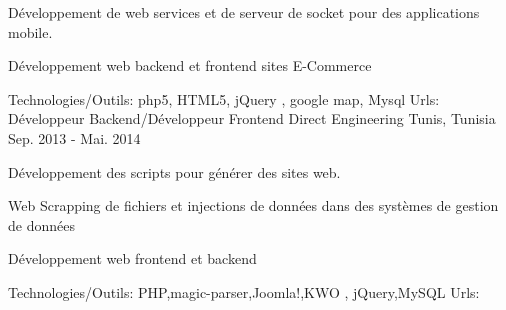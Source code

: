 \begin{cventries}
{\begin{cvitems}
        \item {Développement de web services et de serveur de socket pour des applications mobile.}
        \item {Développement web backend et frontend sites E-Commerce}
      \end{cvitems}
    }
    {\textcolor{awesome}{Technologies/Outils: } {\color{graytext}}  {php5, HTML5, jQuery , google map, Mysql}}
    {Urls:} 
    {\href{http://www.taxitasso.com/}{} \break
    \href{http://carafrika.net/}{} \break
    \href{http://darafrika.com/}{} \break    
    }       
  \techentries
    {Développeur Backend/Développeur Frontend}
    {Direct Engineering}
    {Tunis, Tunisia}
    {Sep. 2013 - Mai. 2014}
    {
      \begin{cvitems}
        \item {Développement des scripts pour générer des sites web.}
        \item {Web Scrapping de fichiers et injections de données dans des systèmes de gestion de données}
        \item {Développement web frontend et backend}
      \end{cvitems}
    }
    {\textcolor{awesome}{Technologies/Outils: } {\color{graytext}}  {PHP,magic-parser,Joomla!,KWO , jQuery,MySQL}}
    {Urls:} 
    {\href{http://www.pure-jobs.com/}{} \break
    \href{http://www.jeveux1truc.fr/fr/}{} \break
    }       
\end{cventries}
